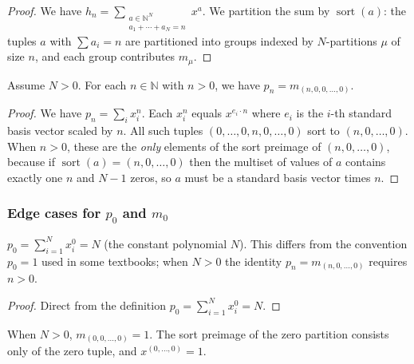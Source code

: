 \begin{proof}
\leanok
We have $h_n = \sum_{\substack{a \in \mathbb{N}^N \\ a_1 + \cdots + a_N = n}} x^a$.
We partition the sum by $\operatorname{sort}(a)$: the tuples $a$ with $\sum a_i = n$
are partitioned into groups indexed by $N$-partitions $\mu$ of size $n$,
and each group contributes $m_\mu$.
\end{proof}

\begin{theorem}
\label{prop.sf.ehp-through-m.c}
\leanhelper
\leanok
Assume $N > 0$. For each $n \in \mathbb{N}$ with $n > 0$, we have
$p_n = m_{(n, 0, 0, \ldots, 0)}$.
\end{theorem}

\begin{proof}
\leanok
We have $p_n = \sum_i x_i^n$. Each $x_i^n$ equals $x^{e_i \cdot n}$
where $e_i$ is the $i$-th standard basis vector scaled by $n$.
All such tuples $(0, \ldots, 0, n, 0, \ldots, 0)$ sort to $(n, 0, \ldots, 0)$.
When $n > 0$, these are the \emph{only} elements of the sort preimage of
$(n, 0, \ldots, 0)$, because if $\operatorname{sort}(a) = (n, 0, \ldots, 0)$ then
the multiset of values of $a$ contains exactly one $n$ and $N-1$ zeros,
so $a$ must be a standard basis vector times $n$.
\end{proof}

\subsubsection{Edge cases for $p_0$ and $m_0$}

\begin{lemma}
\label{lem.sf.psum-zero}
\leanhelper
\leanok
$p_0 = \sum_{i=1}^N x_i^0 = N$ (the constant polynomial $N$).
This differs from the convention $p_0 = 1$ used in some textbooks;
when $N > 0$ the identity $p_n = m_{(n,0,\ldots,0)}$ requires $n > 0$.
\end{lemma}

\begin{proof}
\leanok
Direct from the definition $p_0 = \sum_{i=1}^N x_i^0 = N$.
\end{proof}

\begin{lemma}
\label{lem.sf.m-zero-partition}
\leanhelper
\leanok
When $N > 0$, $m_{(0, 0, \ldots, 0)} = 1$.
The sort preimage of the zero partition consists only of the zero tuple,
and $x^{(0,\ldots,0)} = 1$.
\end{lemma}

